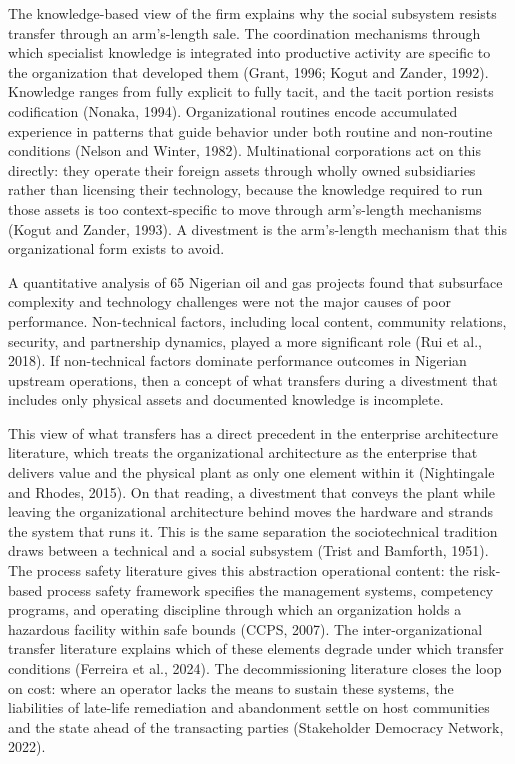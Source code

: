 \documentclass[twoside,fontset=lmodern]{mitthesis}
\begin{document}
The knowledge-based view of the firm explains why the social subsystem
resists transfer through an arm's-length sale. The coordination
mechanisms through which specialist knowledge is integrated into
productive activity are specific to the organization that developed them
(Grant, 1996; Kogut and Zander, 1992). Knowledge ranges from fully
explicit to fully tacit, and the tacit portion resists codification
(Nonaka, 1994). Organizational routines encode accumulated experience in
patterns that guide behavior under both routine and non-routine
conditions (Nelson and Winter, 1982). Multinational corporations act on
this directly: they operate their foreign assets through wholly owned
subsidiaries rather than licensing their technology, because the
knowledge required to run those assets is too context-specific to move
through arm's-length mechanisms (Kogut and Zander, 1993). A divestment
is the arm's-length mechanism that this organizational form exists to
avoid.

A quantitative analysis of 65 Nigerian oil and gas projects found that
subsurface complexity and technology challenges were not the major
causes of poor performance. Non-technical factors, including local
content, community relations, security, and partnership dynamics, played
a more significant role (Rui et al., 2018). If non-technical factors
dominate performance outcomes in Nigerian upstream operations, then a
concept of what transfers during a divestment that includes only
physical assets and documented knowledge is incomplete.

This view of what transfers has a direct precedent in the enterprise
architecture literature, which treats the organizational architecture as
the enterprise that delivers value and the physical plant as only one
element within it (Nightingale and Rhodes, 2015). On that reading, a
divestment that conveys the plant while leaving the organizational
architecture behind moves the hardware and strands the system that runs
it. This is the same separation the sociotechnical tradition draws
between a technical and a social subsystem (Trist and Bamforth, 1951).
The process safety literature gives this abstraction operational
content: the risk-based process safety framework specifies the
management systems, competency programs, and operating discipline
through which an organization holds a hazardous facility within safe
bounds (CCPS, 2007). The inter-organizational transfer literature
explains which of these elements degrade under which transfer conditions
(Ferreira et al., 2024). The decommissioning literature closes the loop
on cost: where an operator lacks the means to sustain these systems, the
liabilities of late-life remediation and abandonment settle on host
communities and the state ahead of the transacting parties (Stakeholder
Democracy Network, 2022).
\end{document}
